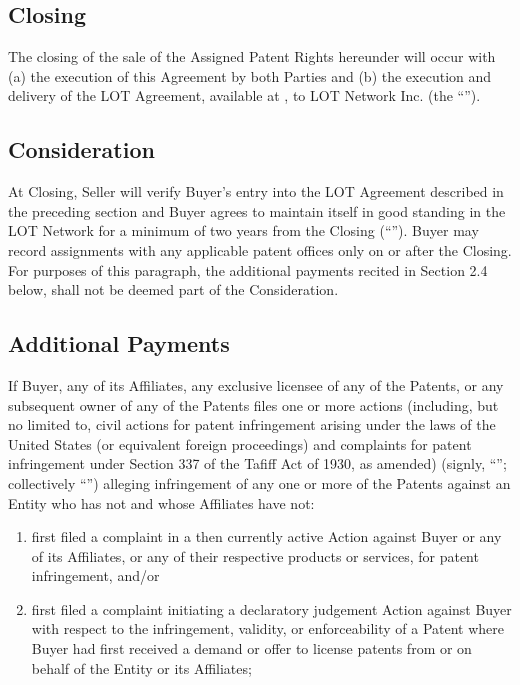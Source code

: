 \documentclass[letterpaper,10pt,openany,oneside,english]{sphinxmanual}
\begin{document}
\subsection{Closing}
\label{\detokenize{2-delivery:closing}}
The closing of the sale of the Assigned Patent Rights hereunder will occur with (a) the execution of this Agreement by both Parties and (b) the execution and delivery of the LOT Agreement, available at , to LOT Network Inc. (the “”).


\subsection{Consideration}
\label{\detokenize{2-delivery:consideration}}
At Closing, Seller will verify Buyer’s entry into the LOT Agreement described in the preceding section and Buyer agrees to maintain itself in good standing in the LOT Network for a minimum of two years from the Closing (“”). Buyer may record assignments with any applicable patent offices only on or after the Closing. For purposes of this paragraph, the additional payments recited in Section 2.4 below, shall not be deemed part of the Consideration.


\subsection{Additional Payments}
\label{\detokenize{2-delivery:additional-payments}}
If Buyer, any of its Affiliates, any exclusive licensee of any of the Patents, or any subsequent owner of any of the Patents files one or more actions (including, but no limited to, civil actions for patent infringement arising under the laws of the United States (or equivalent foreign proceedings) and complaints for patent infringement under Section 337 of the Tafiff Act of 1930, as amended) (signly, “”; collectively “”) alleging infringement of any one or more of the Patents against an Entity who has not and whose Affiliates have not:
\begin{enumerate}
\item {} 
first filed a complaint in a then currently active Action against Buyer or any of its Affiliates, or any of their respective products or services, for patent infringement, and/or

\item {} 
first filed a complaint initiating a declaratory judgement Action against Buyer with respect to the infringement, validity, or enforceability of a Patent where Buyer had first received a demand or offer to license patents from or on behalf of the Entity or its Affiliates;

\end{enumerate}
\end{document}
